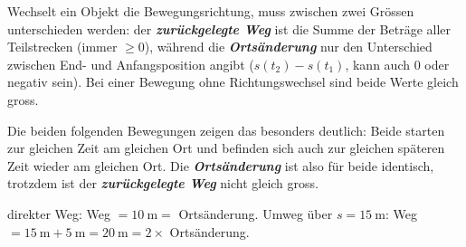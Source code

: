 \begin{theoriebox}
Wechselt ein Objekt die Bewegungsrichtung, muss zwischen zwei Grössen
unterschieden werden: der \textbf{\emph{zurückgelegte Weg}} ist die Summe der
Beträge aller Teilstrecken (immer $\geq 0$), während die
\textbf{\emph{Ortsänderung}} nur den Unterschied zwischen End- und Anfangsposition
angibt ($s(t_2) - s(t_1)$, kann auch $0$ oder negativ sein). Bei einer
Bewegung ohne Richtungswechsel sind beide Werte gleich gross.

Die beiden folgenden Bewegungen zeigen das besonders deutlich: Beide
starten zur gleichen Zeit am gleichen Ort und befinden sich auch zur
gleichen späteren Zeit wieder am gleichen Ort. Die \textbf{\emph{Ortsänderung}}
ist also für beide identisch, trotzdem ist der \textbf{\emph{zurückgelegte Weg}}
nicht gleich gross.

\begin{center}

\footnotesize \textcolor{accentorange}{direkter Weg}: Weg $=\SI{10}{\meter}=$ Ortsänderung. \quad \textcolor{titleblue}{Umweg über $s=\SI{15}{\meter}$}: Weg $=\SI{15}{\meter}+\SI{5}{\meter}=\SI{20}{\meter}=2\times$ Ortsänderung.
\end{center}
\end{theoriebox}

